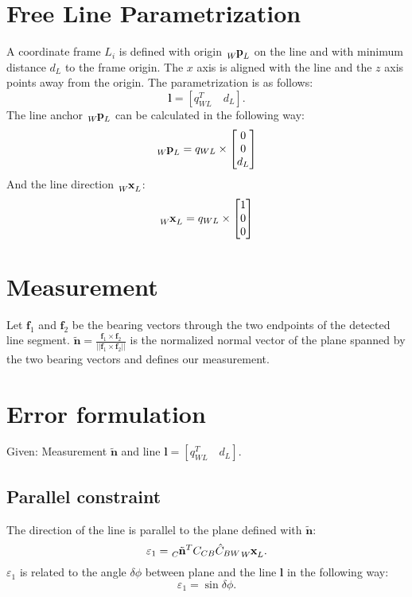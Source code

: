 \documentclass[10pt,a4paper]{article}
\author{Andreas Forster}
\numberwithin{equation}{section}
\renewcommand{\vec}[1]{\ensuremath{\mathbf{#1}}}
\newcommand{\norm}[1]{\ensuremath{\left|\left|#1\right|\right|}}
\begin{document}
\section{Free Line Parametrization}
A coordinate frame $L_i$ is defined with origin $\tensor[_W]{\vec{p}}{_L}$ on the line and with minimum distance $d_{L}$ to the frame origin. The $x$ axis is aligned with the line and the $z$ axis points away from the origin. The parametrization is as follows:
\begin{equation}
\vec{l} = \left[q_{WL}^T \quad d_L\right].
\end{equation}
The line anchor $\tensor[_W]{\vec{p}}{_L}$ can be calculated in the following way:
\begin{equation}
\tensor[_W]{\vec{p}}{_L} = q_{WL}\times\begin{bmatrix}
0\\0\\d_L\end{bmatrix}
\end{equation}
And the line direction $\tensor[_W]{\vec{x}}{_L}$:
\begin{equation}
\tensor[_W]{\vec{x}}{_L} = q_{WL}\times\begin{bmatrix}1\\0\\0 \end{bmatrix}
\end{equation}
%
\section{Measurement}
Let $\vec{f}_1$ and $\vec{f}_2$ be the bearing vectors through the two endpoints of the detected line segment. $\tilde{\vec{n}} = \frac{\vec{f}_1\times\vec{f}_2}{\norm{\vec{f}_1\times\vec{f}_2}}$ is the normalized normal vector of the plane spanned by the two bearing vectors and defines our measurement.
%
\section{Error formulation}
Given: Measurement $\tilde{\vec{n}}$ and line $\vec{l} = [q_{WL}^T\quad d_L]$.
\subsection{Parallel constraint}
The direction of the line is parallel to the plane defined with $\tilde{\vec{n}}$:
\begin{equation}
\varepsilon_1 = \tensor[_C]{\tilde{\vec{n}}}{^T}C_{CB}\hat{C}_{BW}\tensor[_W]{\vec{x}}{_L}.
\end{equation}
$\varepsilon_1$ is related to the angle $\delta\phi$ between plane and the line $\vec{l}$ in the following way:
\begin{equation}
\varepsilon_1 = \sin \delta\phi.
\end{equation}
\end{document}
